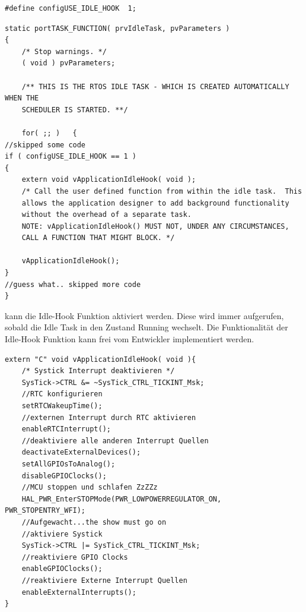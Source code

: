 \begin{lstlisting}[label=lst:defineIdleHook, numbers = none]
#define configUSE_IDLE_HOOK  1; 
\end{lstlisting}
\begin{lstlisting}[caption={Aufruf der IdleTask Hook Funktion durch die FreeRTOS Idle Task. Aus Task.c},captionpos=b, label=lst:xIdleTaskHook, float=htb!]
static portTASK_FUNCTION( prvIdleTask, pvParameters )
{
	/* Stop warnings. */
	( void ) pvParameters;

	/** THIS IS THE RTOS IDLE TASK - WHICH IS CREATED AUTOMATICALLY WHEN THE
	SCHEDULER IS STARTED. **/

	for( ;; )	{
//skipped some code
if ( configUSE_IDLE_HOOK == 1 )
{
	extern void vApplicationIdleHook( void );
	/* Call the user defined function from within the idle task.  This
	allows the application designer to add background functionality
	without the overhead of a separate task.
	NOTE: vApplicationIdleHook() MUST NOT, UNDER ANY CIRCUMSTANCES,
	CALL A FUNCTION THAT MIGHT BLOCK. */
	
	vApplicationIdleHook();
}
//guess what.. skipped more code
}     
\end{lstlisting}
kann die Idle-Hook Funktion aktiviert werden. Diese wird immer aufgerufen, sobald die Idle Task in den Zustand Running wechselt. Die Funktionalität der Idle-Hook Funktion kann frei vom Entwickler implementiert werden. 
\begin{lstlisting}[caption={Pseudocode für eine Idle Hook Funktion},captionpos=b, label=lst:xIdleHookExamp, float=hbt!]
extern "C" void vApplicationIdleHook( void ){
	/* Systick Interrupt deaktivieren */
	SysTick->CTRL &= ~SysTick_CTRL_TICKINT_Msk;
	//RTC konfigurieren
	setRTCWakeupTime();
	//externen Interrupt durch RTC aktivieren
	enableRTCInterrupt();
	//deaktiviere alle anderen Interrupt Quellen
	deactivateExternalDevices();
	setAllGPIOsToAnalog(); 
	disableGPIOClocks();
	//MCU stoppen und schlafen ZzZZz
	HAL_PWR_EnterSTOPMode(PWR_LOWPOWERREGULATOR_ON, PWR_STOPENTRY_WFI); 
	//Aufgewacht...the show must go on
	//aktiviere Systick
	SysTick->CTRL |= SysTick_CTRL_TICKINT_Msk;
	//reaktiviere GPIO Clocks
	enableGPIOClocks();
	//reaktiviere Externe Interrupt Quellen
	enableExternalInterrupts();	
}
\end{lstlisting}
